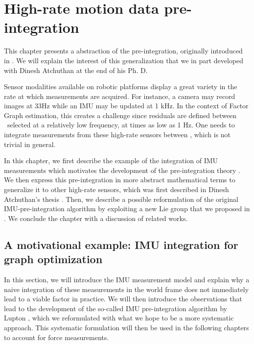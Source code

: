 \chapter{High-rate motion data pre-integration}
\label{chp:pre-integration}
\minitoc
\bigskip

This chapter presents a abstraction of the pre-integration, originally introduced in \cite{lupton-09, forster2015imu}. We will explain
the interest of this generalization that we in part developed with Dinesh Atchuthan at the end of his Ph. D.

Sensor modalities available on robotic platforms display a great variety in the rate at which measurements are acquired. For instance, 
a camera may record images at 33Hz while an IMU may be updated at 1 kHz. In the context of Factor Graph estimation, this creates a challenge since residuals
are defined between \keyframes\ selected at a relatively low frequency, at times as low as 1 Hz. One needs to integrate measurements from these high-rate sensors between \keyframes,
which is not trivial in general.

In this chapter, we first describe the example of the integration of IMU measurements which motivates the development of the pre-integration theory \cite{lupton-09,forster2015imu}.
We then express this pre-integration in more abstract mathematical terms to generalize it to other high-rate sensors, which was first described in Dinesh Atchuthan's thesis \cite{atchuthan-18-thesis}. 
Then, we describe a possible reformulation of the original IMU-pre-integration algorithm \cite{forster2017-TRO} by exploiting a new Lie group that we 
proposed in \cite{fourmy2019absolute}. We conclude the chapter with a discussion of related works.

  
\section{A motivational example: IMU integration for graph optimization}
\label{sec:imu_preint_motivation}

In this section, we will introduce the IMU measurement model and explain why a naive integration of these measurements in the world frame does not immediately
lead to a viable factor in practice. We will then introduce the observations that lead to the development of the so-called IMU pre-integration algorithm by Lupton \cite{lupton-09},
which we reformulated with what we hope to be a more systematic approach. This systematic formulation will then be used 
in the following chapters to account for force measurements.

